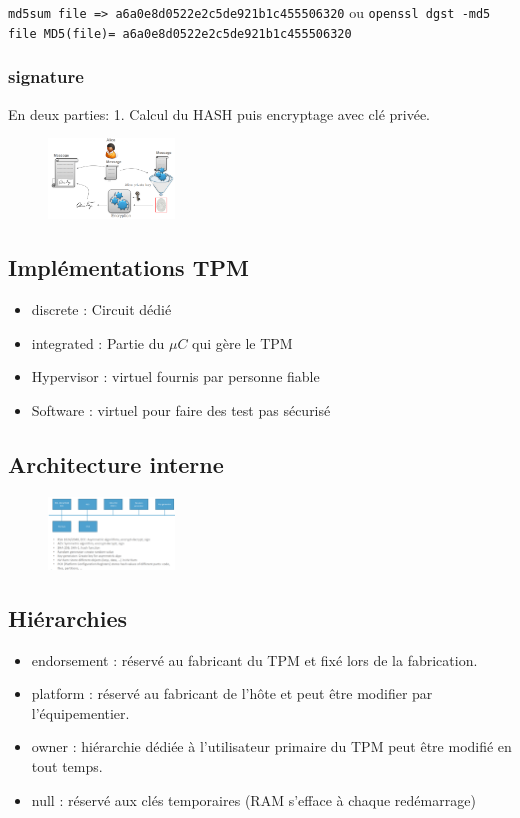 \documentclass[resume]{subfiles}
\begin{document}
\verb!md5sum file => a6a0e8d0522e2c5de921b1c455506320! ou \verb!openssl dgst -md5 file MD5(file)= a6a0e8d0522e2c5de921b1c455506320!  

\subsubsection{signature}

En deux parties: 1. Calcul du HASH puis encryptage avec clé privée. 
\begin{figure}[H]
    \centering
    \includegraphics[width=0.3\textwidth]{Figures/TPM/signature.png}
\end{figure}

\subsection{Implémentations TPM}
\begin{itemize}
\item discrete : Circuit dédié 
\item integrated : Partie du $\mu C$ qui gère le TPM
\item Hypervisor : virtuel fournis par personne fiable
\item Software : virtuel pour faire des test pas sécurisé
\end{itemize}

\subsection{Architecture interne}

\begin{figure}[H]
    \centering
    \includegraphics[width=0.3\textwidth]{Figures/TPM/internal.png}
\end{figure}

\subsection{Hiérarchies}
\begin{itemize}
\item endorsement : réservé au fabricant du TPM et fixé lors de la fabrication.
\item platform : réservé au fabricant de l'hôte et peut être modifier par l'équipementier.
\item owner : hiérarchie dédiée à l'utilisateur primaire du TPM peut être modifié en tout temps.
\item null : réservé aux clés temporaires (RAM s'efface à chaque redémarrage)
\end{itemize}
\end{document}
